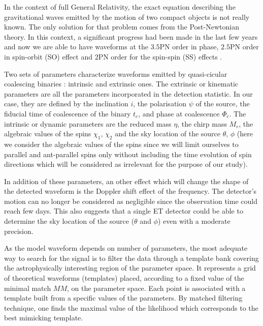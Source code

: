 In the context of full General Relativity, the exact equation describing the gravitational waves emitted by the motion of two compact objects is not really known. The only solution for that problem comes from the Post-Newtonian theory. In this context, a significant progress  had been made in the last few years and now we are able to have waveforms at the $3.5$PN order in phase, $2.5$PN order in  spin-orbit (SO) effect and  $2$PN order for the spin-spin (SS) effects \cite{ARUN2009}.


Two sets of parameters characterize waveforms emitted by  quasi-cicular coalescing binaries %
:  intrinsic and extrinsic ones. The extrinsic or 
kinematic parameters are all the parameters incorporated in the detection statistic. In our case, they are defined by the inclination $i$, the
polarisation $\psi$ of the source,  the fiducial time of coalescence of the binary $t_c$,  and phase at coalescence $\Phi_c$.  The intrinsic or
dynamic parameters are the reduced mass $\eta$, the chirp mass $M_c$, the algebraic values of the spins $\chi_1$, $\chi_2$ and the sky location of the source $\theta$, $\phi$ (here we consider the algebraic values of the spins since we will limit ourselves to parallel and ant-parallel spins only without including the time evolution of spin directions which will be considered as irrelevant for the purpose of our study).


In addition of these parameters, an other effect which will change the shape of the detected waveform is the Doppler shift effect of the frequency. The detector's motion can no longer be considered as negligible since the observation time could reach few days. This also suggests that a single ET detector could be able to determine the sky location of the source ($\theta$ and $\phi$) even with a moderate precision. 



As the model waveform depends on  number of parameters, the most adequate way to search for the signal is to filter the data through a template bank covering the astrophysically interesting region of the parameter space\cite{owen97, BABAK2006}. It represents a grid of theoretical waveforms (templates) placed, according to a fixed value of the minimal match $MM$, on the parameter space. Each point is associated with a template built from a specific values of the parameters. By matched filtering technique, one finds the maximal value of the likelihood which corresponds to the best mimicking template.


